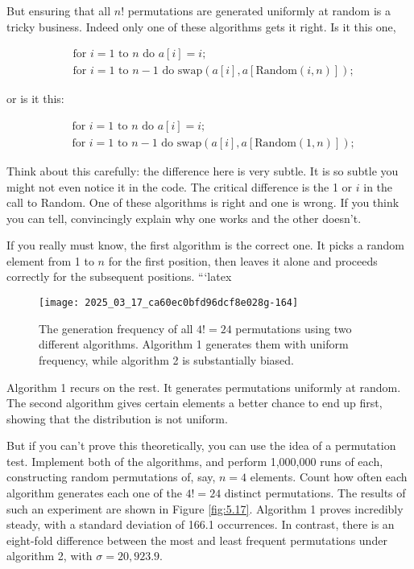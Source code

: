 \documentclass[10pt]{article}
\begin{document}
But ensuring that all $n!$ permutations are generated uniformly at random is a tricky business. Indeed only one of these algorithms gets it right. Is it this one,

\[
\begin{aligned}
&\text{for } i=1 \text{ to } n \text{ do } a[i]=i; \\
&\text{for } i=1 \text{ to } n-1 \text{ do } \text{swap}(a[i], a[\text{Random}(i, n)]);
\end{aligned}
\]

or is it this:

\[
\begin{aligned}
&\text{for } i=1 \text{ to } n \text{ do } a[i]=i; \\
&\text{for } i=1 \text{ to } n-1 \text{ do } \text{swap}(a[i], a[\text{Random}(1, n)]);
\end{aligned}
\]

Think about this carefully: the difference here is very subtle. It is so subtle you might not even notice it in the code. The critical difference is the 1 or $i$ in the call to Random. One of these algorithms is right and one is wrong. If you think you can tell, convincingly explain why one works and the other doesn’t.

If you really must know, the first algorithm is the correct one. It picks a random element from 1 to $n$ for the first position, then leaves it alone and proceeds correctly for the subsequent positions.
```latex
\pagebreak
\begin{figure}[H]
    \centering
    \texttt{[image: 2025\_03\_17\_ca60ec0bfd96dcf8e028g-164]}
    \caption{The generation frequency of all $4!=24$ permutations using two different algorithms. Algorithm 1 generates them with uniform frequency, while algorithm 2 is substantially biased.}
\end{figure}

Algorithm 1 recurs on the rest. It generates permutations uniformly at random. The second algorithm gives certain elements a better chance to end up first, showing that the distribution is not uniform.

But if you can't prove this theoretically, you can use the idea of a permutation test. Implement both of the algorithms, and perform 1,000,000 runs of each, constructing random permutations of, say, $n = 4$ elements. Count how often each algorithm generates each one of the $4!=24$ distinct permutations. The results of such an experiment are shown in Figure \ref{fig:5.17}. Algorithm 1 proves incredibly steady, with a standard deviation of 166.1 occurrences. In contrast, there is an eight-fold difference between the most and least frequent permutations under algorithm 2, with $\sigma=20,923.9$.
\end{document}
